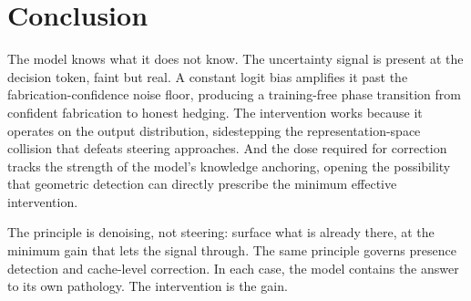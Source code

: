 \documentclass[11pt,a4paper]{article}
\begin{document}
\section{Conclusion}
\label{sec:conclusion}

The model knows what it does not know. The uncertainty signal is present at the
decision token, faint but real. A constant logit bias amplifies it past the
fabrication-confidence noise floor, producing a training-free phase transition
from confident fabrication to honest hedging. The intervention works because it
operates on the output distribution, sidestepping the representation-space
collision that defeats steering approaches. And the dose required for
correction tracks the strength of the model's knowledge anchoring, opening the
possibility that geometric detection can directly prescribe the minimum
effective intervention.

The principle is denoising, not steering: surface what is already there, at
the minimum gain that lets the signal through. The same principle governs
presence detection and cache-level correction. In each case, the model
contains the answer to its own pathology. The intervention is the gain.



\end{document}

